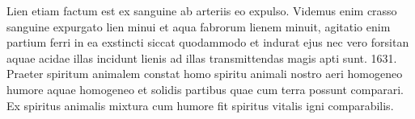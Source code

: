 Lien etiam factum est ex sanguine ab arteriis eo expulso. Videmus enim crasso sanguine expurgato lien minui et aqua fabrorum lienem minuit, agitatio enim partium ferri in ea exstincti siccat quodammodo et indurat ejus 
\pend
\count{}
\count{}
\newpage
\pstart\noindent nec vero forsitan aquae acidae illas incidunt
lienis ad illas transmittendas magis apti sunt.
\pend%
\vspace{0.7em}%
\pstart%
\noindent%
1631.%
Praeter spiritum animalem constat homo spiritu animali nostro aeri homogeneo humore aquae homogeneo et solidis partibus quae cum terra possunt comparari.
Ex spiritus animalis mixtura cum humore fit spiritus vitalis igni comparabilis.%
